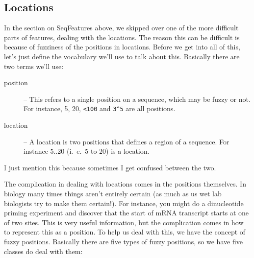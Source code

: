 \documentclass{report}
\begin{document}
\subsection{Locations}
\label{sec:locations}

In the section on SeqFeatures above, we skipped over one of the more difficult parts of features, dealing with the locations. The reason this can be difficult is because of fuzziness of the positions in locations. Before we get into all of this, let's just define the vocabulary we'll use to talk about this. Basically there are two terms we'll use:

\begin{description}
  \item[position] -- This refers to a single position on a sequence,
  which may be fuzzy or not. For instance, 5, 20, \verb|<100| and
  \verb|3^5| are all positions.

  \item[location] -- A location is two positions that defines a region of a sequence. For instance 5..20 (i.~e.~5 to 20) is a location.
\end{description}

I just mention this because sometimes I get confused between the two.

The complication in dealing with locations comes in the positions themselves. In biology many times things aren't entirely certain (as much as us wet lab biologists try to make them certain!). For instance, you might do a dinucleotide priming experiment and discover that the start of mRNA transcript starts at one of two sites. This is very useful information, but the complication comes in how to represent this as a position. To help us deal with this, we have the concept of fuzzy positions. Basically there are five types of fuzzy positions, so we have five classes do deal with them:
\end{document}
